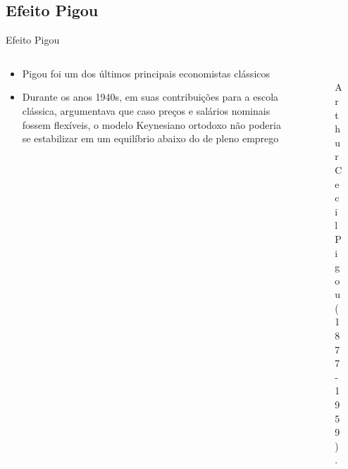 \documentclass[10pt]{beamer}
\begin{document}
\subsection{Efeito Pigou}
\begin{frame}{Efeito Pigou}
    \begin{columns}
\begin{column}{0.5\textwidth}
        \begin{itemize}
            \item Pigou foi um dos últimos principais economistas clássicos
            \bigskip
            \item Durante os anos 1940s, em suas contribuições para a escola clássica, argumentava que caso preços e salários nominais fossem flexíveis, o modelo Keynesiano ortodoxo não poderia se estabilizar em um equilíbrio abaixo do de pleno emprego
        \end{itemize}
\end{column}
\begin{column}{0.5\textwidth}
    \begin{figure}
    \centering
        \includegraphics[width=0.5\textwidth]{./figures/aula7_fig4.jpg}
        \caption{Arthur Cecil Pigou (1877-1959).}
        \label{fig4}
    \end{figure}
\end{column}
\end{columns}
\end{frame}
\end{document}
